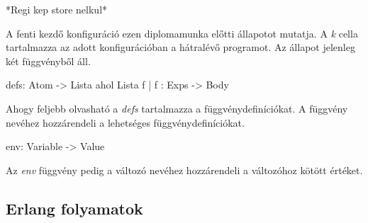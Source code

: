 *Regi kep store nelkul*

A fenti kezdő konfiguráció ezen diplomamunka előtti állapotot mutatja. A \textit{k} cella tartalmazza az adott konfigurációban a hátralévő programot. Az állapot jelenleg két függvényből áll. 

defs: Atom -> Lista ahol Lista {f | f : Exps -> Body}

Ahogy feljebb olvasható a \textit{defs} tartalmazza a függvénydefiníciókat. A függvény nevéhez hozzárendeli a lehetséges függvénydefiníciókat.

env: Variable -> Value

Az \textit{env} függvény pedig a változó nevéhez hozzárendeli a változóhoz kötött értéket.


\subsection{Erlang folyamatok}